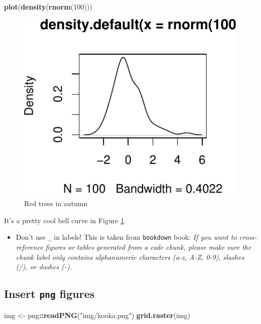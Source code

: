 \documentclass[12pt,]{article}
\newenvironment{Shaded}{\begin{snugshade}}{\end{snugshade}}
\newcommand{\KeywordTok}[1]{\textcolor[rgb]{0.13,0.29,0.53}{\textbf{#1}}}
\newcommand{\DecValTok}[1]{\textcolor[rgb]{0.00,0.00,0.81}{#1}}
\newcommand{\StringTok}[1]{\textcolor[rgb]{0.31,0.60,0.02}{#1}}
\newcommand{\OperatorTok}[1]{\textcolor[rgb]{0.81,0.36,0.00}{\textbf{#1}}}
\newcommand{\NormalTok}[1]{#1}
\providecommand{\tightlist}{%
  \setlength{\itemsep}{0pt}\setlength{\parskip}{0pt}}
\begin{document}
\begin{Shaded}
\begin{Highlighting}[]
\KeywordTok{plot}\NormalTok{(}\KeywordTok{density}\NormalTok{(}\KeywordTok{rnorm}\NormalTok{(}\DecValTok{100}\NormalTok{)))}
\end{Highlighting}
\end{Shaded}

\begin{figure}
\centering
\includegraphics{img/bell-curve-1.pdf}
\caption{\label{fig:bell-curve}Red trees in autumn}
\end{figure}

It's a pretty cool bell curve in Figure \ref{fig:bell-curve}.

\begin{itemize}
\tightlist
\item
  Don't use \texttt{\_} in labels! This is taken from \texttt{bookdown}
  book: \emph{If you want to cross-reference figures or tables generated
  from a code chunk, please make sure the chunk label only contains
  alphanumeric characters (a-z, A-Z, 0-9), slashes (/), or dashes (-).}
\end{itemize}

\subsection{\texorpdfstring{Insert \texttt{png}
figures}{Insert png figures}}\label{insert-png-figures}

\begin{Shaded}
\begin{Highlighting}[]
\NormalTok{img <-}\StringTok{ }\NormalTok{png}\OperatorTok{::}\KeywordTok{readPNG}\NormalTok{(}\StringTok{"img/kooka.png"}\NormalTok{)}
\KeywordTok{grid.raster}\NormalTok{(img)}
\end{Highlighting}
\end{Shaded}
\end{document}
